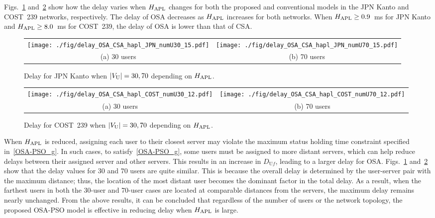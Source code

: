 \documentclass[10pt, letterpaper]{IEEEtran}
\begin{document}
\begin{CJK}{UTF8}{ipxm}
Figs.~\ref{fig:delay_OSA_CSA_hapl_JPN} and~\ref{fig:delay_OSA_CSA_hapl_COST} show how the delay varies when $H_{\rm APL}$ changes for both the proposed and conventional models in the JPN Kanto and COST~239 networks, respectively.
The delay of OSA decreases as $H_{\rm APL}$ increases for both networks.
When $H_{\rm APL} \geq 0.9$~ms for JPN Kanto and $H_{\rm APL} \geq 8.0$~ms for COST~239, the delay of OSA is lower than that of CSA.
\begin{figure}[t]
  \begin{center}
      \begin{tabular}{cc}
      \texttt{[image: ./fig/delay\_OSA\_CSA\_hapl\_JPN\_numU30\_15.pdf]} &
      \texttt{[image: ./fig/delay\_OSA\_CSA\_hapl\_JPN\_numU70\_15.pdf]} \\
      (a) 30 users & (b) 70 users
      \end{tabular}
  \end{center}
  \caption{Delay for JPN Kanto when $|V_{\rm U}| = 30, 70$ depending on $H_{\rm APL}$.}
  \label{fig:delay_OSA_CSA_hapl_JPN}
\end{figure}
\begin{figure}[t]
  \begin{center}
      \begin{tabular}{cc}
      \texttt{[image: ./fig/delay\_OSA\_CSA\_hapl\_COST\_numU30\_12.pdf]} &
      \texttt{[image: ./fig/delay\_OSA\_CSA\_hapl\_COST\_numU70\_12.pdf]} \\
      (a) 30 users & (b) 70 users
      \end{tabular}
  \end{center}
  \caption{Delay for COST~239 when $|V_{\rm U}| = 30, 70$ depending on $H_{\rm APL}$.}
  \label{fig:delay_OSA_CSA_hapl_COST}
\end{figure}
When $H_{\rm APL}$ is reduced, assigning each user to their closest server may violate the maximum status holding time constraint specified in~\eqref{OSA-PSO_g}.
In such cases, to satisfy~\eqref{OSA-PSO_g}, some users must be assigned to more distant servers, which can help reduce delays between their assigned server and other servers.
This results in an increase in $D_{\mathrm{U}f}$, leading to a larger delay for OSA.
Figs.~\ref{fig:delay_OSA_CSA_hapl_JPN} and~\ref{fig:delay_OSA_CSA_hapl_COST} show that the delay values for 30 and 70 users are quite similar.
This is because the overall delay is determined by the user-server pair with the maximum distance; thus, the location of the most distant user becomes the dominant factor in the total delay.
As a result, when the farthest users in both the 30-user and 70-user cases are located at comparable distances from the servers, the maximum delay remains nearly unchanged.
From the above results, it can be concluded that regardless of the number of users or the network topology, the proposed OSA-PSO model is effective in reducing delay when $H_{\rm APL}$ is large.


\end{CJK}
\end{document}
